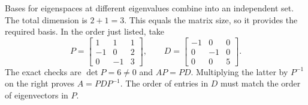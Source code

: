 Bases for eigenspaces at different eigenvalues combine into an independent set. The total dimension is $2+1=3$.
This equals the matrix size, so it provides the required basis. In the order just listed, take
\[P=\begin{bmatrix}1&1&1\\-1&0&2\\0&-1&3\end{bmatrix},\qquad D=\begin{bmatrix}-1&0&0\\0&-1&0\\0&0&5\end{bmatrix}.\]
The exact checks are $\det P=6\ne0$ and $AP=PD$. Multiplying the latter by $P^{-1}$ on the right proves $A=PDP^{-1}$. The order of entries in $D$ must match the order of eigenvectors in $P$.



